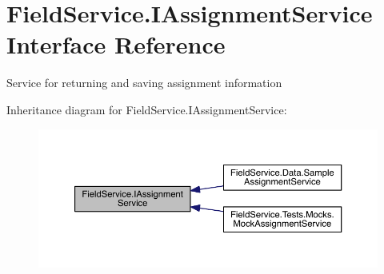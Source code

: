 \hypertarget{interface_field_service_1_1_i_assignment_service}{\section{Field\+Service.\+I\+Assignment\+Service Interface Reference}
\label{interface_field_service_1_1_i_assignment_service}
}


Service for returning and saving assignment information  




Inheritance diagram for Field\+Service.\+I\+Assignment\+Service\+:
\nopagebreak
\begin{figure}[H]
\begin{center}
\leavevmode
\includegraphics[width=350pt]{interface_field_service_1_1_i_assignment_service__inherit__graph}
\end{center}
\end{figure}
